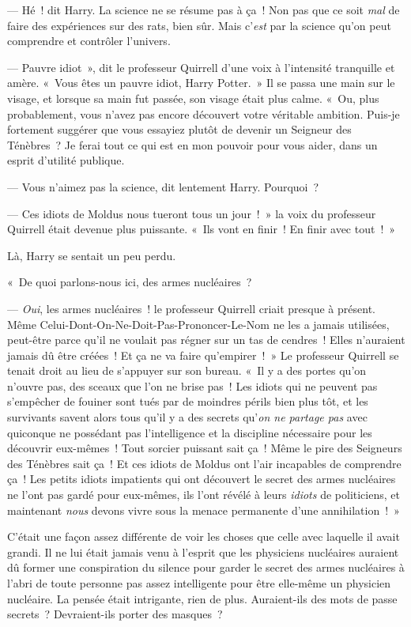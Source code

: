--- Hé~! dit Harry.
La science ne se résume pas à ça~!
Non pas que ce soit \emph{mal} de faire des expériences sur des rats, bien sûr.
Mais c'\emph{est} par la science qu'on peut comprendre et contrôler l'univers.

--- Pauvre idiot~», dit le professeur Quirrell d'une voix à l'intensité tranquille et amère.
«~Vous êtes un pauvre idiot, Harry Potter.~»
Il se passa une main sur le visage, et lorsque sa main fut passée, son visage était plus calme.
«~Ou, plus probablement, vous n'avez pas encore découvert votre véritable ambition.
Puis-je fortement suggérer que vous essayiez plutôt de devenir un Seigneur des Ténèbres~?
Je ferai tout ce qui est en mon pouvoir pour vous aider, dans un esprit d'utilité publique.

--- Vous n'aimez pas la science, dit lentement Harry.
Pourquoi~?

--- Ces idiots de Moldus nous tueront tous un jour~!~»
la voix du professeur Quirrell était devenue plus puissante.
«~Ils vont en finir~!
En finir avec tout~!~»

Là, Harry se sentait un peu perdu.

«~De quoi parlons-nous ici, des armes nucléaires~?

--- \emph{Oui}, les armes nucléaires~! le professeur Quirrell criait presque à présent.
Même Celui-Dont-On-Ne-Doit-Pas-Prononcer-Le-Nom ne les a jamais utilisées, peut-être parce qu'il ne voulait pas régner sur un tas de cendres~!
Elles n'auraient jamais dû être créées~!
Et ça ne va faire qu'empirer~!~»
Le professeur Quirrell se tenait droit au lieu de s'appuyer sur son bureau.
«~Il y a des portes qu'on n'ouvre pas, des sceaux que l'on ne brise pas~!
Les idiots qui ne peuvent pas s'empêcher de fouiner sont tués par de moindres périls bien plus tôt, et les survivants savent alors tous qu'il y a des secrets qu'\emph{on ne partage pas} avec quiconque ne possédant pas l'intelligence et la discipline nécessaire pour les découvrir eux-mêmes~!
Tout sorcier puissant sait ça~!
Même le pire des Seigneurs des Ténèbres sait ça~!
Et ces idiots de Moldus ont l'air incapables de comprendre ça~!
Les petits idiots impatients qui ont découvert le secret des armes nucléaires ne l'ont pas gardé pour eux-mêmes, ils l'ont révélé à leurs \emph{idiots} de politiciens, et maintenant \emph{nous} devons vivre sous la menace permanente d'une annihilation~!~»

C'était une façon assez différente de voir les choses que celle avec laquelle il avait grandi.
Il ne lui était jamais venu à l'esprit que les physiciens nucléaires auraient dû former une conspiration du silence pour garder le secret des armes nucléaires à l'abri de toute personne pas assez intelligente pour être elle-même un physicien nucléaire.
La pensée était intrigante, rien de plus.
Auraient-ils des mots de passe secrets~?
Devraient-ils porter des masques~?

